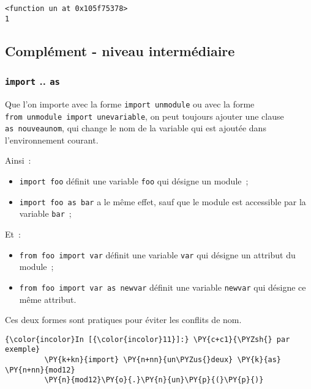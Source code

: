     \begin{Verbatim}[commandchars=\\\{\},frame=single,framerule=0.3mm,rulecolor=\color{cellframecolor}]
<function un at 0x105f75378>
1
\end{Verbatim}

    \hypertarget{compluxe9ment---niveau-intermuxe9diaire}{%
\subsection{Complément - niveau
intermédiaire}\label{compluxe9ment---niveau-intermuxe9diaire}}

    \hypertarget{import-..-as}{%
\subsubsection{\texorpdfstring{\texttt{import} ..
\texttt{as}}{import .. as}}\label{import-..-as}}

    Que l'on importe avec la forme \texttt{import\ unmodule} ou avec la
forme \texttt{from\ unmodule\ import\ unevariable}, on peut toujours
ajouter une clause \texttt{as\ nouveaunom}, qui change le nom de la
variable qui est ajoutée dans l'environnement courant.

    Ainsi~:

\begin{itemize}
\tightlist
\item
  \texttt{import\ foo} définit une variable \texttt{foo} qui désigne un
  module~;
\item
  \texttt{import\ foo\ as\ bar} a le même effet, sauf que le module est
  accessible par la variable \texttt{bar}~;
\end{itemize}

    Et~:

\begin{itemize}
\tightlist
\item
  \texttt{from\ foo\ import\ var} définit une variable \texttt{var} qui
  désigne un attribut du module~;
\item
  \texttt{from\ foo\ import\ var\ as\ newvar} définit une variable
  \texttt{newvar} qui désigne ce même attribut.
\end{itemize}

    Ces deux formes sont pratiques pour éviter les conflits de nom.

    \begin{Verbatim}[commandchars=\\\{\},frame=single,framerule=0.3mm,rulecolor=\color{cellframecolor}]
{\color{incolor}In [{\color{incolor}11}]:} \PY{c+c1}{\PYZsh{} par exemple}
         \PY{k+kn}{import} \PY{n+nn}{un\PYZus{}deux} \PY{k}{as} \PY{n+nn}{mod12}
         \PY{n}{mod12}\PY{o}{.}\PY{n}{un}\PY{p}{(}\PY{p}{)}
\end{Verbatim}


